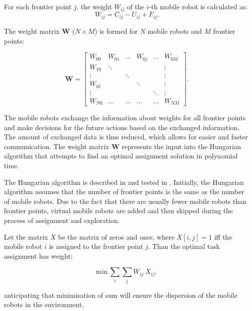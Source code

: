 For each frontier point $j$, the weight $W_{ij}$ of the $i$-th mobile robot is calculated as: 
\begin{equation}
   {W}_{ij}= {C_{ij}} - {U_{ij}} + {F_{ij}}.
   \label{weight}
\end{equation}

The weight matrix $\boldsymbol{W}$ ($N\times M$) is formed for $N$ mobile robots and $M$ frontier points: 

\begin{equation}
    \boldsymbol{W} = \begin{bmatrix}
    W_{00} & W_{01} & \hdots & W_{0j} & \hdots & W_{0M}\\
    W_{10} & \ddots & & & & \vdots\\
    \vdots & & \ddots & & &  \vdots \\
    W_{i0} & & & \ddots & & \vdots \\
    \vdots & & & & \ddots & \vdots\\
    W_{N0} & \hdots  & \hdots  & \hdots  & \hdots &    W_{NM}
    \end{bmatrix}.
\end{equation}

The mobile robots exchange the information about weights for all frontier points and make decisions for the future actions based on the exchanged information. The amount of exchanged data is thus reduced, which allows for easier and faster communication.
The weight matrix $\boldsymbol{W}$ represents the input into the Hungarian algorithm that attempts to find an optimal assignment solution in polynomial time.

The Hungarian algorithm is described in \cite{Kuhn1955} and tested in \cite{Kulich2015}. Initially, the Hungarian algorithm assumes that the number of frontier points is the same as the number of mobile robots. Due to the fact that there are usually fewer mobile robots than frontier points, virtual mobile robots are added and then skipped during the process of assignment and exploration.

Let the matrix $X$ be the matrix of zeros and ones, where $X[i,j]=1$ iff the mobile robot $i$ is assigned to the frontier point $j$.
Than the optimal task assignment has weight:

\begin{equation}
     {\mathrm{min}}\ \sum_{i} \sum_{j} W_{ij}\ X_{ij},
\end{equation}

anticipating that minimisation of sum will ensure the dispersion of the mobile robots in the environment. 

